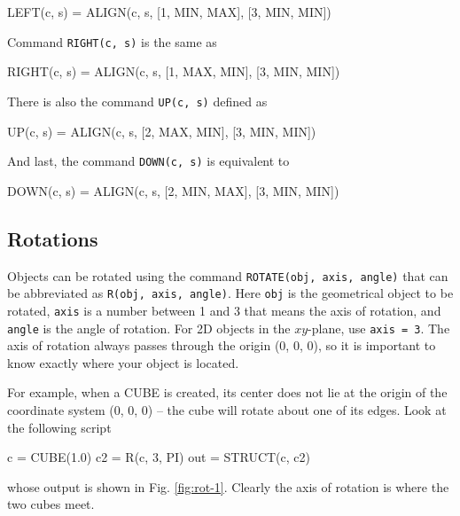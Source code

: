 \begin{bluecode}
LEFT(c, s) = ALIGN(c, s, [1, MIN, MAX], [3, MIN, MIN])
\end{bluecode}
Command {\tt RIGHT(c, s)} is the same as

\begin{bluecode}
RIGHT(c, s) = ALIGN(c, s, [1, MAX, MIN], [3, MIN, MIN])
\end{bluecode}
There is also the command {\tt UP(c, s)} defined as

\begin{bluecode}
UP(c, s) = ALIGN(c, s, [2, MAX, MIN], [3, MIN, MIN])
\end{bluecode}
And last, the command {\tt DOWN(c, s)} is equivalent to

\begin{bluecode}
DOWN(c, s) = ALIGN(c, s, [2, MIN, MAX], [3, MIN, MIN])
\end{bluecode}

\subsection{Rotations}

Objects can be rotated using the command {\tt ROTATE(obj, axis, angle)} 
that can be abbreviated as {\tt R(obj, axis, angle)}. Here {\tt obj} is
the geometrical object to be rotated, {\tt axis} is a number between 
1 and 3 that means the axis of rotation, and {\tt angle} is the angle of 
rotation. For 2D objects in the $xy$-plane, use {\tt axis = 3}. The axis of rotation 
always passes through the origin (0, 0, 0), so it is important 
to know exactly where your object is located. 

For example, when a CUBE is created, its center does not lie
at the origin of the coordinate system (0, 0, 0) -- the cube will 
rotate about one of its edges. Look at the following script 

\begin{bluecode}
c = CUBE(1.0)
c2 = R(c, 3, PI)
out = STRUCT(c, c2)
\end{bluecode}
whose output is shown in Fig. \ref{fig:rot-1}. Clearly the axis of 
rotation is where the two cubes meet.

